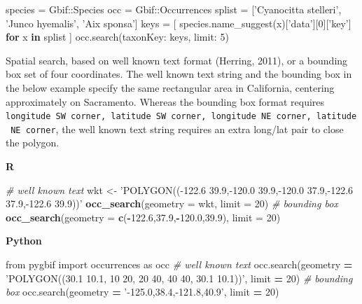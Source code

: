 \documentclass[author-year, review, 11pt]{components/elsarticle} %
\newenvironment{Shaded}{\begin{snugshade}}{\end{snugshade}}
\newcommand{\KeywordTok}[1]{\textcolor[rgb]{0.13,0.29,0.53}{\textbf{#1}}}
\newcommand{\DataTypeTok}[1]{\textcolor[rgb]{0.13,0.29,0.53}{#1}}
\newcommand{\DecValTok}[1]{\textcolor[rgb]{0.00,0.00,0.81}{#1}}
\newcommand{\FloatTok}[1]{\textcolor[rgb]{0.00,0.00,0.81}{#1}}
\newcommand{\StringTok}[1]{\textcolor[rgb]{0.31,0.60,0.02}{#1}}
\newcommand{\ImportTok}[1]{#1}
\newcommand{\CommentTok}[1]{\textcolor[rgb]{0.56,0.35,0.01}{\textit{#1}}}
\newcommand{\OperatorTok}[1]{\textcolor[rgb]{0.81,0.36,0.00}{\textbf{#1}}}
\newcommand{\NormalTok}[1]{#1}
\begin{document}
\begin{Shaded}
\begin{Highlighting}[]
\NormalTok{species = }\DataTypeTok{Gbif}\NormalTok{::}\DataTypeTok{Species}
\NormalTok{occ = }\DataTypeTok{Gbif}\NormalTok{::}\DataTypeTok{Occurrences}
\NormalTok{splist = [}\StringTok{'Cyanocitta stelleri'}\NormalTok{, }\StringTok{'Junco hyemalis'}\NormalTok{, }\StringTok{'Aix sponsa'}\NormalTok{]}
\NormalTok{keys = [ species.name_suggest(x)[}\StringTok{'data'}\NormalTok{][}\DecValTok{0}\NormalTok{][}\StringTok{'key'}\NormalTok{] }\KeywordTok{for}\NormalTok{ x }\KeywordTok{in}\NormalTok{ splist ]}
\NormalTok{occ.search(}\StringTok{taxonKey: }\NormalTok{keys, }\StringTok{limit: }\DecValTok{5}\NormalTok{)}
\end{Highlighting}
\end{Shaded}

Spatial search, based on well known text format (Herring, 2011), or a
bounding box set of four coordinates. The well known text string and the
bounding box in the below example specify the same rectangular area in
California, centering approximately on Sacramento. Whereas the bounding
box format requires
\texttt{longitude\ SW\ corner,\ latitude\ SW\ corner,\ longitude\ NE\ corner,\ latitude\ NE\ corner},
the well known text string requires an extra long/lat pair to close the
polygon.

\textbf{R}

\begin{Shaded}
\begin{Highlighting}[]
\CommentTok{# well known text}
\NormalTok{wkt <-}\StringTok{ 'POLYGON((-122.6 39.9,-120.0 39.9,-120.0 37.9,-122.6 37.9,-122.6 39.9))'}
\KeywordTok{occ_search}\NormalTok{(}\DataTypeTok{geometry =}\NormalTok{ wkt, }\DataTypeTok{limit =} \DecValTok{20}\NormalTok{)}
\CommentTok{# bounding box}
\KeywordTok{occ_search}\NormalTok{(}\DataTypeTok{geometry =} \KeywordTok{c}\NormalTok{(}\OperatorTok{-}\FloatTok{122.6}\NormalTok{,}\FloatTok{37.9}\NormalTok{,}\OperatorTok{-}\FloatTok{120.0}\NormalTok{,}\FloatTok{39.9}\NormalTok{), }\DataTypeTok{limit =} \DecValTok{20}\NormalTok{)}
\end{Highlighting}
\end{Shaded}

\textbf{Python}

\begin{Shaded}
\begin{Highlighting}[]
\ImportTok{from}\NormalTok{ pygbif }\ImportTok{import}\NormalTok{ occurrences }\ImportTok{as}\NormalTok{ occ}
\CommentTok{# well known text}
\NormalTok{occ.search(geometry }\OperatorTok{=} \StringTok{'POLYGON((30.1 10.1, 10 20, 20 40, 40 40, 30.1 10.1))'}\NormalTok{, limit }\OperatorTok{=} \DecValTok{20}\NormalTok{)}
\CommentTok{# bounding box}
\NormalTok{occ.search(geometry }\OperatorTok{=} \StringTok{'-125.0,38.4,-121.8,40.9'}\NormalTok{, limit }\OperatorTok{=} \DecValTok{20}\NormalTok{)}
\end{Highlighting}
\end{Shaded}
\end{document}
